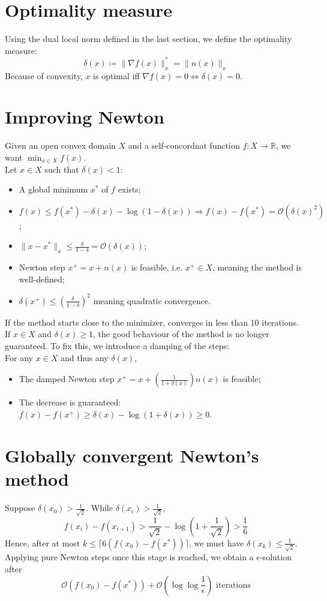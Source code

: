 \documentclass[12pt, openany]{report}
\newcommand{\R}{\mathbb{R}}
\theoremstyle{definition}
\begin{document}
\section{Optimality measure}
Using the dual local norm defined in the last section, we define the optimality measure:
\begin{equation}
    \delta(x)\coloneqq \lVert \nabla f(x)\rVert_x^* = \lVert n(x)\rVert_x
\end{equation}
Because of convexity, $x$ is optimal iff $\nabla f(x) = 0\Longleftrightarrow \delta(x)=0$.
\section{Improving Newton}
Given an open convex domain $X$ and a self-concordnat function $f:X\rightarrow \R$, we want $\min_{x\in X} f(x)$.\\
Let $x\in X$ such that $\delta(x)<1$:
\begin{itemize}
    \item A global minimum $x^*$ of $f$ exists;
    \item $f(x)\le f(x^*)-\delta(x) - \log(1-\delta(x)) \Longrightarrow f(x)-f(x^*) =\mathcal{O}(\delta(x)^2)$;
    \item $\lVert x-x^*\rVert_x \le \frac{\delta}{1-\delta} = \mathcal{O}(\delta(x))$;
    \item Newton step $x^+=x+n(x)$ is feasible, i.e. $x^+\in X$, meaning the method is well-defined;
    \item $\delta(x^+)\le \left(\frac{\delta}{1-\delta}\right)^2$ meaning quadratic convergence. 
\end{itemize}
If the method starts close to the minimizer, converges in less than 10 iterations.\\
If $x\in X$ and $\delta(x)\ge 1$, the good behaviour of the method is no longer guaranteed. To fix this, we introduce a damping of the steps:\\

For any $x\in X$ and thus any $\delta(x)$,
\begin{itemize}
    \item The damped Newton step $x^+=x+\left(\frac{1}{1+\delta(x)}\right)n(x)$ is feasible;
    \item The decrease is guaranteed: $f(x)-f(x^+) \ge \delta(x)-\log(1+\delta(x))\ge 0$.
\end{itemize}
\section{Globally convergent Newton's method}
Suppose $\delta(x_0)>\frac{1}{\sqrt{2}}$. While $\delta(x_i)>\frac{1}{\sqrt{2}}$, 
\begin{equation}
    f(x_i)-f(x_{i+1}) > \frac{1}{\sqrt{2}}-\log(1+\frac{1}{\sqrt{2}}) > \frac{1}{6}
\end{equation}
Hence, after at most $k \le \lceil 6(f(x_0)-f(x^*))\rceil$, we must have $\delta(x_k)\le \frac{1}{\sqrt{2}}$. Applying pure Newton steps once this stage is reached, we obtain a $\epsilon$-solution after 
\begin{equation}
    \mathcal{O}(f(x_0)-f(x^*)) + \mathcal{O}(\log \log \frac{1}{\epsilon}) \text{   iterations}
\end{equation}
\end{document}
